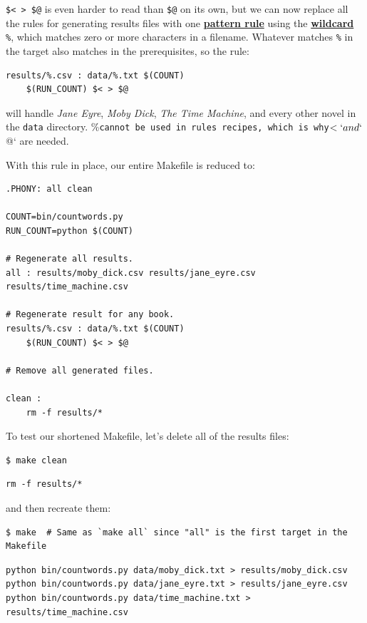 \documentclass[
]{krantz}
\newcommand{\gref}[2]{\hyperlink{#2}{\textbf{#1}}}
\begin{document}
\texttt{\$\textless{}\ \textgreater{}\ \$@} is even harder to read than \texttt{\$@} on its own,
but we can now replace all the rules for generating results files
with one \gref{pattern rule}{pattern\_rule}
using the \gref{wildcard}{wildcard} \texttt{\%},
which matches zero or more characters in a filename.
Whatever matches \texttt{\%} in the target also matches in the prerequisites,
so the rule:

\begin{verbatim}
results/%.csv : data/%.txt $(COUNT)
    $(RUN_COUNT) $< > $@
\end{verbatim}

will handle \emph{Jane Eyre}, \emph{Moby Dick}, \emph{The Time Machine}, and every other novel in the \texttt{data} directory.
\%\texttt{cannot\ be\ used\ in\ rules\textquotesingle{}\ recipes,\ which\ is\ why}\(<` and `\)@` are needed.

With this rule in place, our entire Makefile is reduced to:

\begin{verbatim}
.PHONY: all clean

COUNT=bin/countwords.py
RUN_COUNT=python $(COUNT)

# Regenerate all results.
all : results/moby_dick.csv results/jane_eyre.csv results/time_machine.csv

# Regenerate result for any book.
results/%.csv : data/%.txt $(COUNT)
    $(RUN_COUNT) $< > $@

# Remove all generated files.

clean :
    rm -f results/*
\end{verbatim}

To test our shortened Makefile,
let's delete all of the results files:

\begin{verbatim}
$ make clean
\end{verbatim}

\begin{verbatim}
rm -f results/*
\end{verbatim}

and then recreate them:

\begin{verbatim}
$ make  # Same as `make all` since "all" is the first target in the Makefile
\end{verbatim}

\begin{verbatim}
python bin/countwords.py data/moby_dick.txt > results/moby_dick.csv
python bin/countwords.py data/jane_eyre.txt > results/jane_eyre.csv
python bin/countwords.py data/time_machine.txt > results/time_machine.csv
\end{verbatim}
\end{document}
